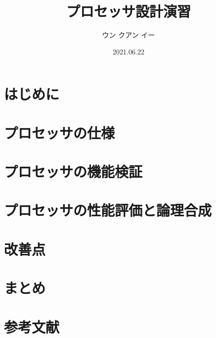 \documentclass[a4paper, 10pt]{jsarticle}
\title{プロセッサ設計演習}
\author{ウン クアン イー}
\date{2021.06.22}
\begin{document}
  
  \maketitle

  \section{はじめに}
  

  \section{プロセッサの仕様}
  

  \section{プロセッサの機能検証}
  

  \section{プロセッサの性能評価と論理合成}
  

  \section{改善点}
  

  \section{まとめ}
  

  \section*{参考文献}
  
\end{document}
